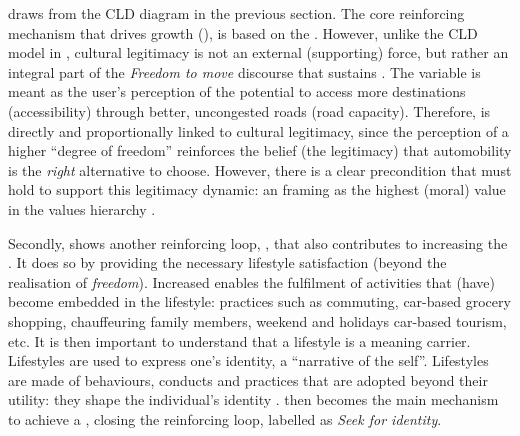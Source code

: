  draws from the CLD diagram in the previous section. The core reinforcing mechanism that drives  growth (), is based on the . However, unlike the CLD model in , cultural legitimacy is not an external (supporting) force, but rather an integral part of the \emph{Freedom to move} discourse that sustains . The  variable is meant as the user's perception of the potential to access more destinations (accessibility) through better, uncongested roads (road capacity). Therefore,  is directly and proportionally linked to cultural legitimacy, since the perception of a higher ``degree of freedom'' reinforces the belief (the legitimacy) that automobility is the \emph{right} alternative to choose. However, there is a clear precondition that must hold to support this legitimacy dynamic: an framing  as the highest (moral) value in the values hierarchy \parencite{urry2004_SystemAutomobility,boehm2006_PartOneConceptualizing,sheller2008_MobilityFreedomPublic}.

Secondly,  shows another reinforcing loop, , that also contributes to increasing the . It does so by providing the necessary lifestyle satisfaction (beyond the realisation of \emph{freedom}). Increased  enables the fulfilment of activities that (have) become embedded in the lifestyle: practices such as commuting, car-based grocery shopping, chauffeuring family members, weekend and holidays car-based tourism, etc. It is then important to understand that a lifestyle is a meaning carrier. Lifestyles are used to express one's identity, a ``narrative of the self''. Lifestyles are made of behaviours, conducts and practices that are adopted beyond their utility: they shape the individual's identity \parencite{giddens1991_ModernitySelfIdentity,spaargaren2000_Lifestylesconsumptionenvironment}.  then becomes the main mechanism to achieve a  \parencite{ropke1999_dynamicswillingnessconsume}, closing the  reinforcing loop, labelled as \emph{Seek for identity}.

